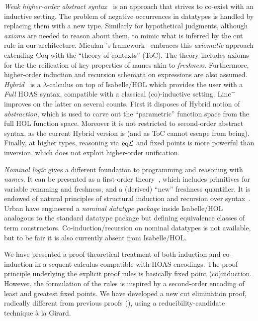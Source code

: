 \documentclass[preprint]{elsarticle}
\newcommand{\Linc}{{\rm Linc}^-}
\newcommand{\eqL}{{\rm eq}{\cal L}}
\begin{document}
\emph{Weak higher-order abstract syntax}~\cite{despeyroux94lpar} is an
approach that strives to co-exist with an inductive setting.  The problem of negative occurrences in datatypes is handled
by replacing them with a new type.  Similarly for 
hypothetical judgments, although  \emph{axioms} are needed to reason about
them, to mimic what is inferred by the cut rule in
our architecture.  Miculan \etal's framework~\cite{HonsellMS01}
embraces this \emph{axiomatic} approach extending Coq with the
``theory of contexts'' (ToC).  The theory includes axioms for the the
reification of key properties of names akin to
\emph{freshness}. Furthermore, higher-order induction and recursion
schemata on expressions are also assumed.
\emph{Hybrid}~\cite{Ambler02,Hybrid} is a $\lambda$-calculus on top of
Isabelle/HOL which provides the user with a \emph{Full} HOAS syntax,
compatible with a classical (co)-inductive setting. $\Linc$ improves
on the latter on several counts. First it disposes of Hybrid notion of
\emph{abstraction}, which is used to carve out the ``parametric''
function space from the full HOL function space.  Moreover it is not
restricted to second-order abstract syntax, as the current Hybrid
version is (and as ToC cannot escape from being). Finally, at higher
types, reasoning via $\eqL$ and fixed points is more powerful than
inversion, which does not exploit higher-order unification.


\emph{Nominal logic} gives a different foundation to programming and
reasoning with \emph{names}. It can be presented as a first-order
theory~\cite{pitts03ic}, which includes primitives for variable
renaming and freshness, and a (derived) ``new'' freshness
quantifier.  It is endowed of  natural principles of 
structural induction and recursion over
syntax~\cite{Pitts06}.  Urban \etal have engineered a \emph{nominal
  datatype package} inside Isabelle/HOL~\cite{Nominal}
analogous to the standard datatype package but defining equivalence
classes of term constructors. Co-induction/recursion on nominal datatypes is not available, but to
be fair it is also currently absent from Isabelle/HOL.





\medskip 

We have presented a proof theoretical treatment of both induction and
co-induction in a sequent calculus compatible with HOAS encodings. The
proof principle underlying the explicit proof rules is basically fixed
point (co)induction. However, the formulation of the rules is inspired
by a second-order encoding of least and greatest fixed points.  We
have developed a new cut elimination proof, radically different from
previous proofs (\cite{mcdowell00tcs,tiu04phd}), using a
reducibility-candidate technique \`a la Girard.
\end{document}
